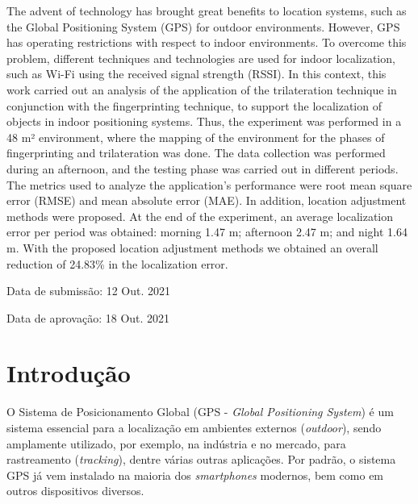 \documentclass[12pt]{artigoifce}
\def\dataSubmissao{12 Out. 2021}
\def\dataAprovacao{18 Out. 2021}
\begin{document}
\newpage

\begin{abstractartigo}
The advent of technology has brought great benefits to location systems, such as the Global Positioning System (GPS) for outdoor environments. However, GPS has operating restrictions with respect to indoor environments. To overcome this problem, different techniques and technologies are used for indoor localization, such as Wi-Fi using the received signal strength (RSSI). In this context, this work carried out an analysis of the application of the trilateration technique in conjunction with the fingerprinting technique, to support the localization of objects in indoor positioning systems. Thus, the experiment was performed in a 48 m² environment, where the mapping of the environment for the phases of fingerprinting and trilateration was done. The data collection was performed during an afternoon, and the testing phase was carried out in different periods. The metrics used to analyze the application's performance were root mean square error (RMSE) and mean absolute error (MAE). In addition, location adjustment methods were proposed. At the end of the experiment, an average localization error per period was obtained: morning 1.47 m; afternoon 2.47 m; and night 1.64 m. With the proposed location adjustment methods we obtained an overall reduction of 24.83\% in the localization error. %
 
\end{abstractartigo}

\begin{flushleft}
    Data de submissão: \dataSubmissao
    
    Data de aprovação: \dataAprovacao    
\end{flushleft}

\section{Introdução}
\label{sec-introducao}

O Sistema de Posicionamento Global (GPS - \textit{Global Positioning System}) é um sistema essencial para a localização em ambientes externos (\textit{outdoor}), sendo amplamente utilizado, por exemplo, na indústria e no mercado, para rastreamento (\textit{tracking}), dentre várias outras aplicações. Por padrão, o sistema GPS já vem instalado na maioria dos \textit{smartphones} modernos, bem como em outros dispositivos diversos. 
\end{document}

